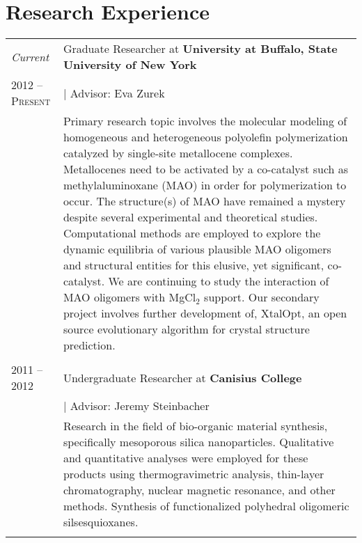 \documentclass[letterpaper,10pt]{article} %
\begin{document}

\section{Research Experience}
\noindent 
\begin{tabular}{R{3cm}|p{13cm}} 

\emph{Current} & Graduate Researcher at \textbf{University at Buffalo, State University of New York} \\
\textsc{2012 -- Present} & \hspace{3mm} \small | Advisor: Eva Zurek \\ 
& \footnotesize{Primary research topic involves the molecular modeling of homogeneous and heterogeneous polyolefin polymerization catalyzed by single-site metallocene complexes. Metallocenes need to be activated by a co-catalyst such as methylaluminoxane (MAO) in order for polymerization to occur. The structure(s) of MAO have remained a mystery despite several experimental and theoretical studies. Computational methods are employed to explore the dynamic equilibria of various plausible MAO oligomers and structural entities for this elusive, yet significant, co-catalyst. We are continuing to study the interaction of MAO oligomers with MgCl$_{2}$ support. Our secondary project involves further development of, XtalOpt, an open source evolutionary algorithm for crystal structure prediction.}\\
 \\


\textsc{2011 -- 2012} & Undergraduate Researcher at \textbf{Canisius College} \\
& \hspace{3mm} \small | Advisor: Jeremy Steinbacher \\ 
& \footnotesize{Research in the field of bio-organic material synthesis, specifically mesoporous silica nanoparticles. Qualitative and quantitative analyses were employed for these products using thermogravimetric analysis, thin-layer chromatography, nuclear magnetic resonance, and other methods. Synthesis of functionalized polyhedral oligomeric silsesquioxanes.}\\
 \\


\end{tabular}
\end{document}
